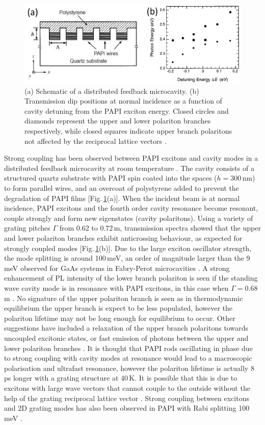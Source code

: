 \begin{figure}[h!]
\centering
\includegraphics[width=\textwidth]{Fig20}
\caption{(a) Schematic of a distributed feedback microcavity. (b) Transmission dip positions at normal incidence as a function of cavity detuning from the PAPI exciton energy. Closed circles and diamonds represent the upper and lower polariton branches respectively, while closed squares indicate upper branch polaritons not affected by the reciprocal lattice vectors \cite{Fujita1998}.}
\label{2Fig20}
\end{figure}
Strong coupling has been observed between PAPI excitons and cavity modes in a distributed feedback microcavity at room temperature \cite{Fujita1998, Fujita1999, Fujita2000}. The cavity consists of a structured quartz substrate with PAPI spin coated into the spaces ($h=300$\,nm) to form parallel wires, and an overcoat of polystyrene added to prevent the degradation of PAPI films [Fig.\,\ref{2Fig20}(a)]. When the incident beam is at normal incidence, PAPI excitons and the fourth order cavity resonance become resonant, couple strongly and form new eigenstates (cavity polaritons). Using a variety of grating pitches $\Gamma$ from 0.62 to 0.72\,\textmu m, transmission spectra showed that the upper and lower polariton branches exhibit anticrossing behaviour, as expected for strongly coupled modes [Fig.\,\ref{2Fig20}(b)]. Due to the large exciton oscillator strength, the mode splitting is around 100\,meV, an order of magnitude larger than the 9\,meV observed for GaAs systems in Fabry-Perot microcavities \cite{Fujita1998}. A strong enhancement of PL intensity of the lower branch polariton is seen if the standing wave cavity mode is in resonance with PAPI excitons, in this case when $\Gamma=0.68\,$\textmu m \cite{Fujita1999}. No signature of the upper polariton branch is seen as in thermodynamic equilibrium the upper branch is expect to be less populated, however the polariton lifetime may not be long enough for equilibrium to occur. Other suggestions have included a relaxation of the upper branch polaritons towards uncoupled excitonic states, or fast emission of photons between the upper and lower polariton branches \cite{Lanty2008}. It is thought that PAPI rods oscillating in phase due to strong coupling with cavity modes at resonance would lead to a macroscopic polarisation and ultrafast resonance, however the polariton lifetime is actually 8\,ps longer with a grating structure at 40\,K. It is possible that this is due to excitons with large wave vectors that cannot couple to the outside without the help of the grating reciprocal lattice vector \cite{Fujita2000}. Strong coupling between excitons and 2D grating modes has also been observed in PAPI with Rabi splitting 100\,meV \cite{Ishi-Hayase2003}.

